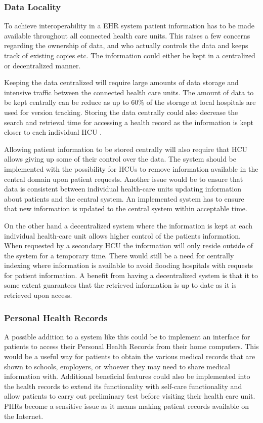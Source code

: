 \documentclass[14pt]{article}
\begin{document}
\subsubsection{Data Locality}
\label{sec:resultsLocality}

To achieve interoperability in a \gls{EHR} system patient information has to be made available throughout all connected health care units. This raises a few concerns regarding the ownership of data, and who actually controls the data and keeps track of existing copies etc. The information could either be kept in a centralized or decentralized manner.

Keeping the data centralized will require large amounts of data storage and intensive traffic between the connected health care units. The amount of data to be kept centrally can be reduce as up to 60\% of the storage at local hospitals are used for version tracking. Storing the data centrally could also decrease the search and retrieval time for accessing a health record as the information is kept closer to each individual \gls{HCU} \cite{Cambio}.

Allowing patient information to be stored centrally will also require that \gls{HCU} allows giving up some of their control over the data. The system should be implemented with the possibility for \glspl{HCU} to remove information available in the central domain upon patient requests. Another issue would be to ensure that data is consistent between individual health-care units updating information about patients and the central system. An implemented system has to ensure that new information is updated to the central system within acceptable time.

On the other hand a decentralized system where the information is kept at each individual health-care unit allows higher control of the patients information. When requested by a secondary \gls{HCU} the information will only reside outside of the system for a temporary time. There would still be a need for centrally indexing where information is available to avoid flooding hospitals with requests for patient information. A benefit from having a decentralized system is that it to some extent guarantees that the retrieved information is up to date as it is retrieved upon access.

\subsubsection{Personal Health Records}
\label{sec:resultsPHR}
A possible addition to a system like this could be to implement an interface for patients to access their Personal Health Records from their home computers. This would be a useful way for patients to obtain the various medical records that are shown to schools, employers, or whoever they may need to share medical information with. Additional beneficial features could also be implemented into the health records to extend its functionality with self-care functionality and allow patients to carry out preliminary test before visiting their health care unit. \glspl{PHR} become a sensitive issue as it means making patient records available on the Internet.
\end{document}
